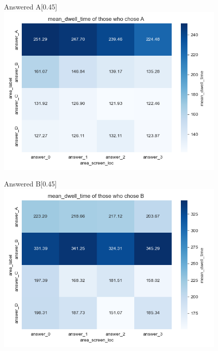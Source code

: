 \documentclass[manuscript,review,anonymous]{acmart}
\begin{document}
        
        \begin{figure}[htbp]
          \centering
          \begin{subcaptionbox}{Answered A\label{fig:a5}}[0.45\textwidth]
            {\centering\includegraphics[width=\linewidth]{plots/matrix_plots/matrix_mean_dwell_time_A_hunters.png}}
          \end{subcaptionbox}
          \hfill
          \begin{subcaptionbox}{Answered B\label{fig:b5}}[0.45\textwidth]
            {\centering\includegraphics[width=\linewidth]{plots/matrix_plots/matrix_mean_dwell_time_B_hunters.png}}
          \end{subcaptionbox}
          

\end{figure}
\end{document}
